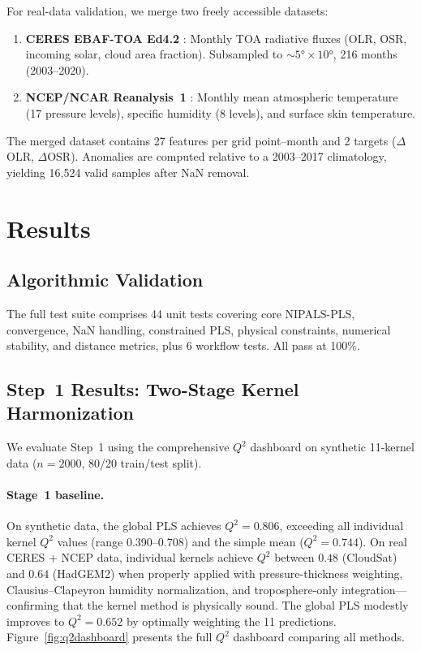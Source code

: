 \documentclass[11pt]{article}
\newcommand{\Qsq}{Q^{2}}
\begin{document}
For real-data validation, we merge two freely accessible datasets:

\begin{enumerate}[noitemsep]
  \item \textbf{CERES EBAF-TOA Ed4.2} \citep{Loeb2018}: Monthly
    TOA radiative fluxes (OLR, OSR, incoming solar, cloud area
    fraction). Subsampled to $\sim 5° \times 10°$, 216 months
    (2003--2020).
  \item \textbf{NCEP/NCAR Reanalysis~1} \citep{Kalnay1996}:
    Monthly mean atmospheric temperature (17 pressure levels),
    specific humidity (8 levels), and surface skin temperature.
\end{enumerate}

The merged dataset contains 27 features per grid point--month
and 2 targets ($\Delta$OLR, $\Delta$OSR). Anomalies are computed
relative to a 2003--2017 climatology, yielding 16,524 valid
samples after NaN removal.

\section{Results}
\label{sec:results}

\subsection{Algorithmic Validation}

The full test suite comprises 44 unit tests covering core
NIPALS-PLS, convergence, NaN handling, constrained PLS, physical
constraints, numerical stability, and distance metrics, plus 6
workflow tests. All pass at 100\%.

\subsection{Step~1 Results: Two-Stage Kernel Harmonization}

We evaluate Step~1 using the comprehensive $\Qsq$ dashboard
on synthetic 11-kernel data ($n = 2000$, 80/20 train/test split).

\paragraph{Stage~1 baseline.}
On synthetic data, the global PLS achieves $\Qsq = 0.806$,
exceeding all individual kernel $\Qsq$ values (range 0.390--0.708)
and the simple mean ($\Qsq = 0.744$). On real CERES + NCEP data,
individual kernels achieve $\Qsq$ between $0.48$ (CloudSat)
and $0.64$ (HadGEM2) when properly applied with
pressure-thickness weighting, Clausius--Clapeyron humidity
normalization, and troposphere-only integration---confirming
that the kernel method is physically sound. The global PLS
modestly improves to $\Qsq = 0.652$ by optimally weighting the
11 predictions. Figure~\ref{fig:q2dashboard} presents the full
$\Qsq$ dashboard comparing all methods.
\end{document}
